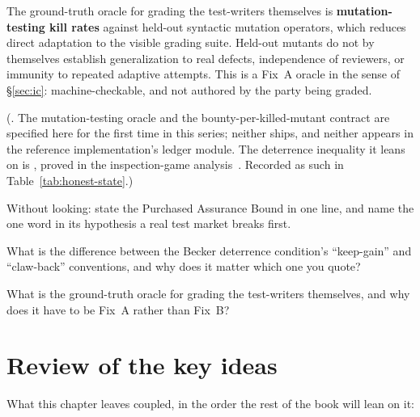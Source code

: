 \documentclass[11pt,a4paper]{article}
\theoremstyle{definition}
\theoremstyle{definition}
\theoremstyle{remark}
\begin{document}
The ground-truth oracle for grading the test-writers themselves is
\textbf{mutation-testing kill rates} against held-out syntactic mutation operators,
which reduces direct adaptation to the visible grading suite. Held-out mutants
do not by themselves establish generalization to real defects, independence of
reviewers, or immunity to repeated adaptive attempts. This is a
Fix~A oracle in the sense of \S\ref{sec:ic}: machine-checkable, and not authored by
the party being graded.

\vspace{4pt}
\noindent(\Vision{}. The mutation-testing oracle and the bounty-per-killed-mutant
contract are specified here for the first time in this series; neither ships, and
neither appears in the reference implementation's ledger module. The deterrence
inequality it leans on is \Designed{}, proved in the inspection-game
analysis~. Recorded as such in
Table~\ref{tab:honest-state}.)

\begin{pdrecitation}
\item Without looking: state the Purchased Assurance Bound in one line, and name
  the one word in its hypothesis a real test market breaks first.
\item What is the difference between the Becker deterrence condition's
  ``keep-gain'' and ``claw-back'' conventions, and why does it matter which one
  you quote?
\item What is the ground-truth oracle for grading the test-writers themselves,
  and why does it have to be Fix~A rather than Fix~B?
\end{pdrecitation}

\section*{Review of the key ideas}

What this chapter leaves coupled, in the order the rest of the book will lean on it:
\end{document}
